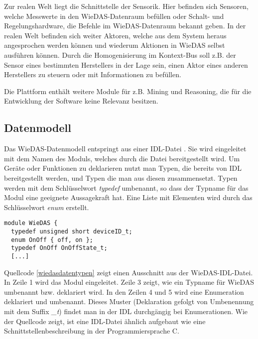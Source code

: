 Zur realen Welt liegt die Schnittstelle der Sensorik.
Hier befinden sich Sensoren, welche Messwerte \cite[Plattform]{wiedas} in den WieDAS-Datenraum befüllen oder
Schalt- und Regelungshardware, die Befehle im WieDAS-Datenraum bekannt geben.
In der realen Welt befinden sich weiter Aktoren, welche aus dem System heraus angesprochen werden können
und wiederum Aktionen in WieDAS selbst ausführen können.
Durch die Homogenisierung im Kontext-Bus soll z.B. der Sensor eines bestimmten Herstellers in der
Lage sein, einen Aktor eines anderen Herstellers zu steuern oder mit Informationen zu befüllen.

Die Plattform enthält weitere Module für z.B. Mining und Reasoning, die für die Entwicklung
der Software keine Relevanz besitzen.

\subsection{Datenmodell}
\label{gru_wiedas_daten}

Das WieDAS-Datenmodell entspringt aus einer IDL-Datei \cite{wiedas_idl}.
Sie wird eingeleitet mit dem Namen des Moduls, welches durch die Datei bereitgestellt wird.
Um Geräte oder Funktionen zu deklarieren nutzt man Typen, die bereits von IDL bereitgestellt werden,
und Typen die man aus diesen zusammensetzt.
Typen werden mit dem Schlüsselwort \emph{typedef} umbenannt, so dass der Typname für das Modul eine geeignete
Aussagekraft hat.
Eine Liste mit Elementen wird durch das Schlüsselwort \emph{enum} erstellt.
\lstset{language=IDL}
\begin{lstlisting}[frame=single,caption={Typen in WieDAS},label=wiedasdatentypen]
module WieDAS {
  typedef unsigned short deviceID_t;
  enum OnOff { off, on };
  typedef OnOff OnOffState_t;
  [...]
\end{lstlisting}
Quellcode \ref{wiedasdatentypen} zeigt einen Ausschnitt aus der WieDAS-IDL-Datei.
In Zeile 1 wird das Modul eingeleitet.
Zeile 3 zeigt, wie ein Typname für WieDAS umbenannt bzw. deklariert wird.
In den Zeilen 4 und 5 wird eine Enumeration deklariert und umbenannt.
Dieses Muster (Deklaration gefolgt von Umbenennung mit dem Suffix \emph{\_t}) findet man
in der IDL durchgängig bei Enumerationen.
Wie der Quellcode zeigt, ist eine IDL-Datei ähnlich aufgebaut wie eine
Schnittstellenbeschreibung in der Programmiersprache C.

